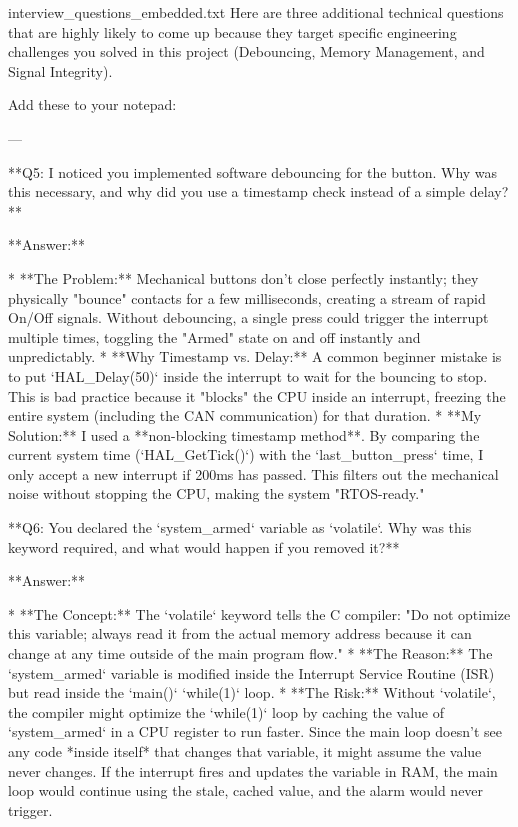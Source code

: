 \begin{filecontents*}{interview_questions_embedded.txt}
Here are three additional technical questions that are highly likely to come up because they target specific engineering challenges you solved in this project (Debouncing, Memory Management, and Signal Integrity).

Add these to your notepad:

---

**Q5: I noticed you implemented software debouncing for the button. Why was this necessary, and why did you use a timestamp check instead of a simple delay?**

**Answer:**

* **The Problem:** Mechanical buttons don't close perfectly instantly; they physically "bounce" contacts for a few milliseconds, creating a stream of rapid On/Off signals. Without debouncing, a single press could trigger the interrupt multiple times, toggling the "Armed" state on and off instantly and unpredictably.
* **Why Timestamp vs. Delay:** A common beginner mistake is to put `HAL_Delay(50)` inside the interrupt to wait for the bouncing to stop. This is bad practice because it "blocks" the CPU inside an interrupt, freezing the entire system (including the CAN communication) for that duration.
* **My Solution:** I used a **non-blocking timestamp method**. By comparing the current system time (`HAL_GetTick()`) with the `last_button_press` time, I only accept a new interrupt if 200ms has passed. This filters out the mechanical noise without stopping the CPU, making the system "RTOS-ready."

**Q6: You declared the `system_armed` variable as `volatile`. Why was this keyword required, and what would happen if you removed it?**

**Answer:**

* **The Concept:** The `volatile` keyword tells the C compiler: "Do not optimize this variable; always read it from the actual memory address because it can change at any time outside of the main program flow."
* **The Reason:** The `system_armed` variable is modified inside the Interrupt Service Routine (ISR) but read inside the `main()` `while(1)` loop.
* **The Risk:** Without `volatile`, the compiler might optimize the `while(1)` loop by caching the value of `system_armed` in a CPU register to run faster. Since the main loop doesn't see any code *inside itself* that changes that variable, it might assume the value never changes. If the interrupt fires and updates the variable in RAM, the main loop would continue using the stale, cached value, and the alarm would never trigger.


\end{filecontents*}
